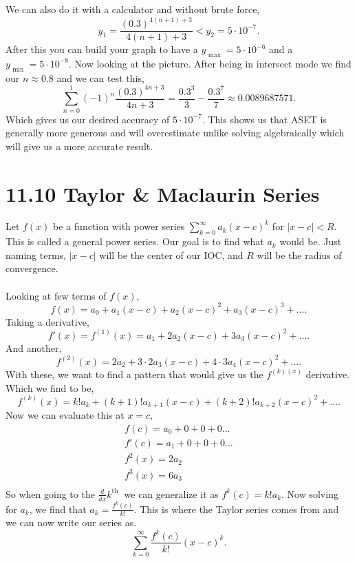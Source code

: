 We can also do it with a calculator and without brute force,
\[
y_1 = \frac{ \left( 0.3 \right) ^{ 4\left( n+1 \right) +3 } }{ 4\left( n+1 \right) +3 }< y_2 = 5\cdot 10^{ -7 }
.\] 
After this you can build your graph to have a $ y_{ \text{ max } }= 5\cdot 10^{ -6 } $ and a $ y_{ \text{ min } }= 5\cdot 10^{ -8 } $. Now looking at the picture. After being in intersect mode we find our $ n\approx 0.8 $ and we can test this,
\[
\sum_{ n=0 } ^{ 1 } \left( -1 \right) ^{ n } \frac{ \left( 0.3 \right) ^{ 4n+3 } }{ 4n+3 } = \frac{ 0.3^{ 3 } }{ 3 }- \frac{ 0.3^{ 7 } }{ 7 } \approx 0.0089687571
.\] 
Which gives us our desired accuracy of $ 5\cdot 10^{ -7 } $. This shows us that ASET is generally more generous and will overestimate unlike solving algebraically which will give us a more accurate result.
\section{11.10 Taylor \& Maclaurin Series}%
Let $ f\left( x \right)  $ be a function with power series $ \sum_{ k=0 } ^{ \infty } a_k\left( x-c \right) ^{ k } $ for $ \left| x-c \right|<R $. This is called a general power series. Our goal is to find what $ a_k $ would be. Just naming terms, $ \left| x-c \right| $ will be the center of our IOC, and $ R $ will be the radius of convergence. \\ \\

Looking at few terms of $ f\left( x \right)  $,
\[
f\left( x \right) =a_0 + a_1\left( x-c \right) + a_2\left( x-c \right) ^{ 2 } + a_3\left( x-c \right) ^{ 3 } + \ldots
.\] 
Taking a derivative,
\[
f'\left( x \right) = f^{ \left( 1 \right)  }\left( x \right) = a_1 + 2a_2\left( x-c \right) + 3a_3\left( x-c \right) ^{ 2 } + \ldots
.\] 
And another,
\[
f^{ \left( 2 \right)  }\left( x \right) = 2a_2 + 3\cdot 2a_3\left( x-c \right) + 4\cdot 3a_4\left( x-c \right) ^{ 2 } + \ldots
.\] 
With these, we want to find a pattern that would give us the $ f^{ \left( k \right) \left( x \right)  } $ derivative. Which we find to be,
\[
f^{ \left( k \right)  }\left( x \right) = k!a_k + \left( k+1 \right)! a_{ k+1 }\left( x-c \right) + \left( k+2 \right) ! a_{ k+2 }\left( x-c \right) ^2 + \ldots
.\] 
Now we can evaluate this at $ x=c $,
\begin{gather*}
f\left( c \right) =a_0 + 0 + 0 + 0\ldots \\
f'\left( c \right) = a_1 + 0 + 0 + 0 \ldots \\
f^{ 2 }\left( x \right) = 2a_2 \\
f^{ 3 }\left( x \right) = 6a_3 \\
\end{gather*}
So when going to the $ \frac{ d }{ dx } k^{ \text{th } } $ we can generalize it as $ f^{ k }\left( c \right) = k!a_k $. Now solving for $ a_k $, we find that $ a_k=\frac{ f^{ k }\left( c \right)  }{ k! } $. This is where the Taylor series comes from and we can now write our series as.
\[
\sum_{ k=0 } ^{ \infty } \frac{ f^{ k }\left( c \right)  }{ k! }\left( x-c \right) ^{ k }
.\] 
